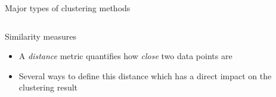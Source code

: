 \documentclass[pdf]{beamer}
\begin{document}
\begin{frame}{Major types of clustering methods}
\begin{columns}
\begin{center}
	\vfill
\end{center}
\end{columns}
\end{frame}
\normalsize
\begin{frame}{Similarity measures}
\begin{itemize}\addtolength{\itemsep}{0.5\baselineskip}
	\item A \textit{distance} metric quantifies how \textit{close} two data points are
	\item Several ways to define this distance which has a direct impact on the clustering result
\end{itemize}
\vfill
\begin{center}
\end{center}
\end{frame}
\end{document}
